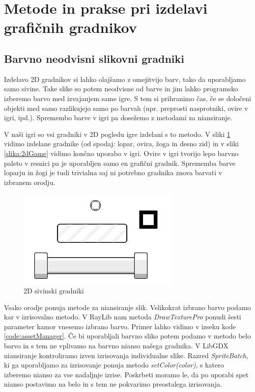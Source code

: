 \documentclass[12pt,a4paper,twoside]{book}
\begin{document}
\section{Metode in prakse pri izdelavi grafičnih gradnikov}
\subsection{Barvno neodvisni slikovni gradniki}
Izdelavo 2D gradnikov si lahko olajšamo z omejitvijo barv, tako da uporabljamo samo sivine. Take slike so potem neodvisne od barve in jim lahko programsko izberemo barvo med izvajanjem same igre. S tem si prihranimo čas, če se določeni objekti med samo razlikujejo samo po barvah (npr. preprosti nasprotniki, ovire v igri, ipd.). Spremembo barve v igri pa dosežemo z metodami za niansiranje.

V naši igri so vsi gradniki v 2D pogledu igre izdelani s to metodo. V sliki \ref{slika:grayscaleSprites} vidimo izdelane gradnike (od spodaj: lopar, ovira, žoga in desno zid) in v sliki \ref{slika:2dGame} vidimo končno uporabo v igri. Ovire v igri tvorijo lepo barvno paleto v resnici pa je uporabljen samo en grafični gradnik. Sprememba barve loparju in žogi je tudi trivialna saj ni potrebno gradnika znova barvati v izbranem orodju. 

\begin{figure}[h]
	\centering
	\includegraphics[width=8cm]{grayscaleSprites}
	\caption{2D sivinski gradniki}
	\label{slika:grayscaleSprites}
\end{figure}

Vsako orodje ponuja metode za niansiranje slik. Velikokrat izbrano barvo podamo kar v izrisovalno metodo. V RayLib nam metoda \textit{DrawTexturePro} ponudi šesti parameter kamor vnesemo izbrano barvo. Primer lahko vidimo v izseku kode \ref{code:assetManager}. Če bi uporabljali barvno sliko potem podamo v metodo belo barvo in s tem ne vplivamo na barvno nianso našega gradnika. V LibGDX niansiranje kontroliramo izven izrisovanja individualne slike. Razred \textit{SpriteBatch}, ki ga uporabljamo za izrisovanje ponuja metodo \textit{setColor(color)}, s katero izberemo nianso za vse nadaljnje izrise. Poskrbeti moramo le, da po uporabi spet nianso postavimo na belo in s tem ne pokvarimo preostalega izrisovanja.
\end{document}
